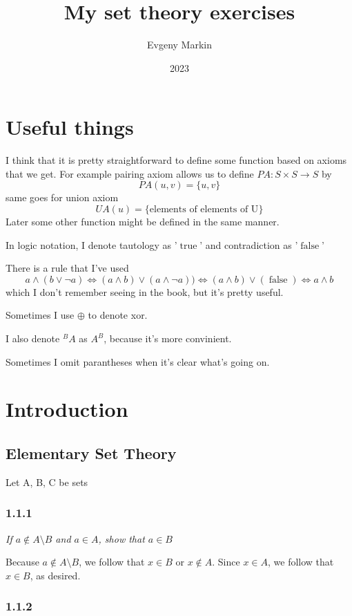 \documentclass[11pt,oneside,titlepage]{book}
\title{My set theory exercises}
\author{Evgeny Markin}
\date{2023}
\DeclareMathOperator \lra {\Leftrightarrow}
\DeclareMathOperator \true {true}
\DeclareMathOperator \false {false}
\begin{document}
\maketitle
\tableofcontents

\chapter*{Useful things}

I think that it is pretty straightforward to define some function based on axioms that we get.
For example pairing axiom allows us to define $PA: S \times S \to S$ by
$$PA(u, v) = \{u, v\}$$
same goes for union axiom
$$UA(u) = \{\text{elements of elements of U}\}$$
Later some other function might be defined in the same manner.

In logic notation, I denote tautology as '$\true$' and contradiction as '$\false$'

There is a rule that I've used
$$a \land (b \lor \neg a) \lra (a \land b) \lor (a \land \neg a))
\lra (a \land b) \lor (\false) \lra a \land b$$
which I don't remember seeing in the book, but it's pretty useful.

Sometimes I use $\oplus$ to denote xor.

I also denote $^BA$ as $A^B$, because it's more convinient.

Sometimes I omit parantheses when it's clear what's going on.

\chapter{Introduction}

\section{Elementary Set Theory}

Let A, B, C be sets

\subsection*{1.1.1}

\textit{If $a \notin A \setminus B$ and $a \in A$, show that $a \in B$}

Because $a \notin A \setminus B$, we follow that $x \in B$ or $x \notin A$. Since $x \in A$, we
follow that $x \in B$, as desired.

\subsection*{1.1.2}
\end{document}
